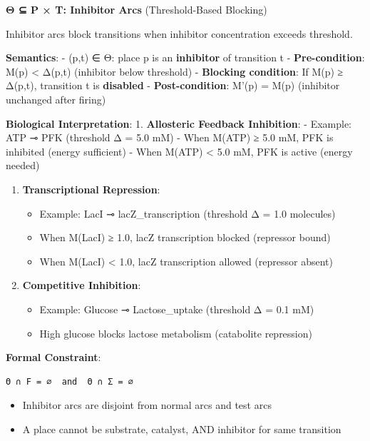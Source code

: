 \textbf{Θ ⊆ P × T: Inhibitor Arcs} (Threshold-Based Blocking)

Inhibitor arcs block transitions when inhibitor concentration exceeds
threshold.

\textbf{Semantics}: - (p,t) ∈ Θ: place p is an \textbf{inhibitor} of
transition t - \textbf{Pre-condition}: M(p) \textless{} Δ(p,t)
(inhibitor below threshold) - \textbf{Blocking condition}: If M(p) ≥
Δ(p,t), transition t is \textbf{disabled} - \textbf{Post-condition}:
M'(p) = M(p) (inhibitor unchanged after firing)

\textbf{Biological Interpretation}: 1. \textbf{Allosteric Feedback
Inhibition}: - Example: ATP ⊸ PFK (threshold Δ = 5.0 mM) - When M(ATP) ≥
5.0 mM, PFK is inhibited (energy sufficient) - When M(ATP) \textless{}
5.0 mM, PFK is active (energy needed)

\begin{enumerate}
\def\labelenumi{\arabic{enumi}.}
\setcounter{enumi}{1}
\tightlist
\item
  \textbf{Transcriptional Repression}:

  \begin{itemize}
  \tightlist
  \item
    Example: LacI ⊸ lacZ\_transcription (threshold Δ = 1.0 molecules)
  \item
    When M(LacI) ≥ 1.0, lacZ transcription blocked (repressor bound)
  \item
    When M(LacI) \textless{} 1.0, lacZ transcription allowed (repressor
    absent)
  \end{itemize}
\item
  \textbf{Competitive Inhibition}:

  \begin{itemize}
  \tightlist
  \item
    Example: Glucose ⊸ Lactose\_uptake (threshold Δ = 0.1 mM)
  \item
    High glucose blocks lactose metabolism (catabolite repression)
  \end{itemize}
\end{enumerate}

\textbf{Formal Constraint}:

\begin{lstlisting}
Θ ∩ F = ∅  and  Θ ∩ Σ = ∅
\end{lstlisting}

\begin{itemize}
\tightlist
\item
  Inhibitor arcs are disjoint from normal arcs and test arcs
\item
  A place cannot be substrate, catalyst, AND inhibitor for same
  transition
\end{itemize}


